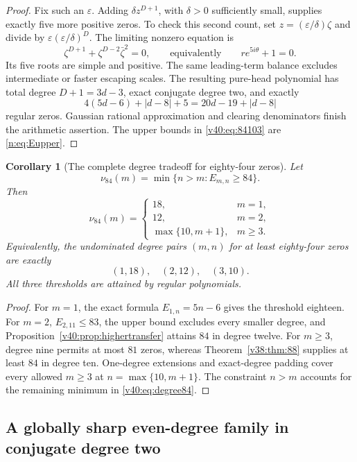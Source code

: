 \documentclass[UTF8,11pt]{ctexart}
\newtheorem{cor}[thm]{Corollary}
\theoremstyle{definition}
\numberwithin{equation}{section}
\begin{document}
\begin{proof}
Fix such an $\varepsilon$. Adding $\delta z^{D+1}$, with
$\delta>0$ sufficiently small, supplies exactly five more
positive zeros. To check this second count, set
$z=(\varepsilon/\delta)\zeta$ and divide by
$\varepsilon(\varepsilon/\delta)^D$. The limiting
nonzero equation is
\[
                     \zeta^{D+1}+\zeta^{D-2}\bar\zeta^2=0,
 \qquad\text{equivalently}\qquad re^{5i\theta}+1=0.
\]
Its five roots are simple and positive. The same leading-term
balance excludes intermediate or faster escaping scales.
The resulting pure-head polynomial has total degree
$D+1=3d-3$, exact conjugate degree two, and exactly
\[
                  4(5d-6)+|d-8|+5=20d-19+|d-8|
\]
regular zeros. Gaussian rational approximation and clearing
denominators finish the arithmetic assertion. The upper
bounds in \eqref{v40:eq:84103} are \eqref{n:eq:Eupper}.
\end{proof}

\begin{cor}[The complete degree tradeoff for eighty-four zeros]
\label{v40:cor:degree84}
Let
\[
 \nu_{84}(m)=\min\{n>m:E_{m,n}\ge84\}.
\]
Then
\begin{equation}\label{v40:eq:degree84}
 \nu_{84}(m)=
 \begin{cases}
 18,&m=1,\\
 12,&m=2,\\
 \max\{10,m+1\},&m\ge3.
 \end{cases}
\end{equation}
Equivalently, the undominated degree pairs $(m,n)$ for at
least eighty-four zeros are exactly
\[
                              (1,18),\quad(2,12),\quad(3,10).
\]
All three thresholds are attained by regular polynomials.
\end{cor}
\begin{proof}
For $m=1$, the exact formula $E_{1,n}=5n-6$ gives the
threshold eighteen. For $m=2$, $E_{2,11}\le83$, the
upper bound excludes every smaller degree, and
Proposition~\ref{v40:prop:highertransfer} attains $84$ in
degree twelve. For $m\ge3$, degree nine permits at most
$81$ zeros, whereas Theorem~\ref{v38:thm:88} supplies
at least $84$ in degree ten. One-degree extensions and
exact-degree padding cover every allowed $m\ge3$ at
$n=\max\{10,m+1\}$. The constraint $n>m$ accounts for
the remaining minimum in \eqref{v40:eq:degree84}.
\end{proof}


\subsection{A globally sharp even-degree family in conjugate degree two}
\label{v40:sec:rectangle}
\end{document}
